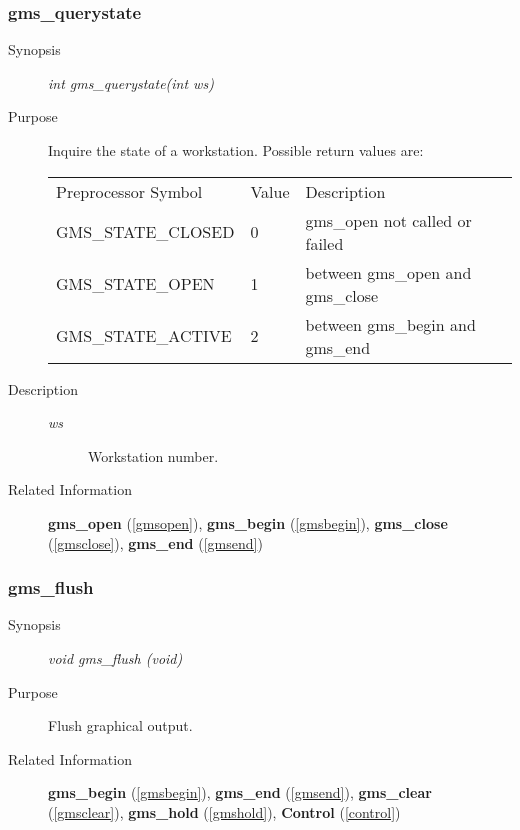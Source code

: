 \subsubsection{gms\_querystate\label{gmsquerystate}}
\begin{description}
\item[Synopsis]\mbox{}


{\em int   gms\_querystate(int ws)\/}
\item[Purpose]\mbox{}


Inquire the state of a workstation.
Possible return values are:
\begin{center}
\begin{tabular}{lll}\hline
Preprocessor Symbol& Value& Description\\ 
GMS\_STATE\_CLOSED & 0 &  gms\_open not called or failed\\ 
GMS\_STATE\_OPEN & 1 &  between gms\_open and gms\_close\\ 
GMS\_STATE\_ACTIVE & 2 &  between gms\_begin and gms\_end\\ 
\hline\end{tabular}
\end{center}

\item[Description]\mbox{}


\begin{description}
\item[{\em ws\/}]\mbox{}

 Workstation number.
\end{description}

\item[Related Information]\mbox{}


{\bf gms\_open} (\ref{gmsopen}), 
{\bf gms\_begin} (\ref{gmsbegin}), 
{\bf gms\_close} (\ref{gmsclose}), 
{\bf gms\_end} (\ref{gmsend})
\end{description}


\newpage



\subsubsection{gms\_flush\label{gmsflush}}
\begin{description}
\item[Synopsis]\mbox{}


{\em void    gms\_flush (void)\/}
\item[Purpose]\mbox{}


Flush graphical output.
\item[Related Information]\mbox{}


{\bf gms\_begin} (\ref{gmsbegin}), 
{\bf gms\_end} (\ref{gmsend}), 
{\bf gms\_clear} (\ref{gmsclear}), 
{\bf gms\_hold} (\ref{gmshold}), 
{\bf Control} (\ref{control})
\end{description}





